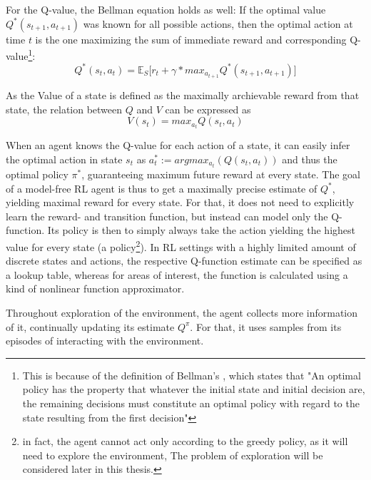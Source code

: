 For the Q-value, the Bellman equation holds as well: If the optimal value $Q^*(s_{t+1},a_{t+1})$ was known for all possible actions, then the optimal action at time $t$ is the one maximizing the sum of immediate reward and corresponding Q-value\footnote{This is because of the definition of Bellman's , which states that "An optimal policy has the property that whatever the initial state and initial decision are, the remaining decisions must constitute an optimal policy with regard to the state resulting from the first decision\cite{Bellman1957}"}:
\begin{equation} \label{bellman}
	Q^*(s_t,a_t) = \mathds{E}_S \big[ r_t + \gamma * max_{a_{t+1}} Q^*(s_{t+1},a_{t+1})  \big]
\end{equation}

As the Value of a state is defined as the maximally archievable reward from that state, the relation between $Q$ and $V$ can be expressed as 
\begin{equation} \label{eq:1.25}
V(s_t) = max_{a_t} Q(s_t, a_t)
\end{equation}

When an agent knows the Q-value for each action of a state, it can easily infer the optimal action in state $s_t$ as $a^*_t := argmax_{a_t}(Q(s_t, a_t))$ and thus the optimal policy $\pi^*$, %
guaranteeing maximum future reward at every state. The goal of a model-free RL agent is thus to get a maximally precise estimate of $Q^*$, yielding maximal reward for every state. For that, it does not need to explicitly learn the reward- and transition function, but instead can model only the Q-function. Its policy is then to simply always take the action yielding the highest value for every state (a  policy\footnote{in fact, the agent cannot act only according to the greedy policy, as it will need to explore the environment, The problem of exploration will be considered later in this thesis.}).  In RL settings with a highly limited amount of discrete states and actions, the respective Q-function estimate can be specified as a lookup table, whereas for areas of interest, the function is calculated using a kind of nonlinear function approximator. 

Throughout exploration of the environment, the agent collects more information of it, continually updating its estimate $Q^\pi$. For that, it uses samples from its episodes of interacting with the environment. %


